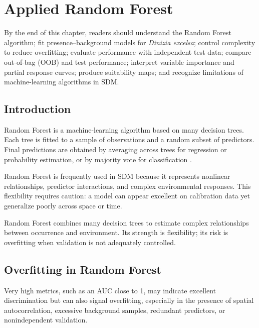 \chapter[Random Forest]{Applied Random Forest}

\begin{objetivos}
By the end of this chapter, readers should understand the Random Forest
algorithm; fit presence--background models for \textit{Dinizia excelsa};
control complexity to reduce overfitting; evaluate performance with independent
test data; compare out-of-bag (OOB) and test performance; interpret variable
importance and partial response curves; produce suitability maps; and recognize
limitations of machine-learning algorithms in SDM.
\end{objetivos}

\section{Introduction}

Random Forest is a machine-learning algorithm based on many decision trees.
Each tree is fitted to a sample of observations and a random subset of
predictors. Final predictions are obtained by averaging across trees for
regression or probability estimation, or by majority vote for classification
\parencite{breiman2001random,cutler2007random,guisan2017habitat}.

Random Forest is frequently used in SDM because it represents nonlinear
relationships, predictor interactions, and complex environmental responses.
This flexibility requires caution: a model can appear excellent on calibration
data yet generalize poorly across space or time.

\begin{conceito}[title={\faBook\quad Random Forest in SDM}]
Random Forest combines many decision trees to estimate complex relationships
between occurrence and environment. Its strength is flexibility; its risk is
overfitting when validation is not adequately controlled.
\end{conceito}

\section{Overfitting in Random Forest}

Very high metrics, such as an AUC close to 1, may indicate excellent
discrimination but can also signal overfitting, especially in the presence of
spatial autocorrelation, excessive background samples, redundant predictors, or
nonindependent validation.

